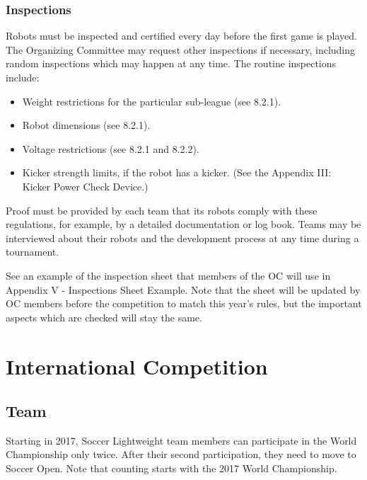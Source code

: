 \documentclass{article}
\begin{document}
\subsubsection{Inspections \label{ref-059}}

Robots must be inspected and certified every day before the first game is
played. The Organizing Committee may request other inspections if necessary,
including random inspections which may happen at any time. The routine
inspections include:

\begin{itemize}
\item Weight restrictions for the particular sub-league (see 8.2.1).

\item Robot dimensions (see 8.2.1).

\item Voltage restrictions (see 8.2.1 and 8.2.2).

\item Kicker strength limits, if the robot has a kicker. (See the Appendix III: Kicker Power Check Device.)
\end{itemize}

Proof must be provided by each team that its robots comply with these
regulations, for example, by a detailed documentation or log book. Teams may be
interviewed about their robots and the development process at any time during a
tournament.

See an example of the inspection sheet that members of the OC will use in
Appendix V - Inspections Sheet Example. Note that the sheet will be updated by
OC members before the competition to match this year's rules, but the important
aspects which are checked will stay the same.


\newpage

\section{International Competition}

\subsection{Team}


Starting in 2017, Soccer Lightweight team members can participate in the World
Championship only twice. After their second participation, they need to move to
Soccer Open. Note that counting starts with the 2017 World Championship.
\end{document}
